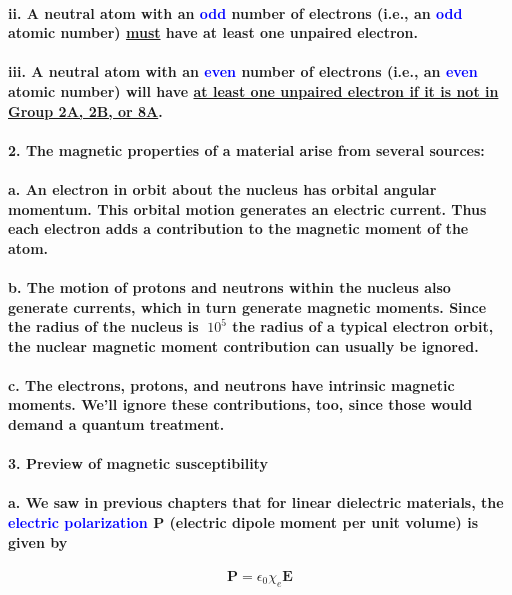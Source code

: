 \documentclass{article}
\begin{document}
\paragraph{\indent\indent ii. A neutral atom with an \textcolor{blue}{odd} number of electrons (i.e., an \textcolor{blue}{odd} atomic number) \underline{must} have at least one unpaired electron.}
\paragraph{\indent\indent iii. A neutral atom with an \textcolor{blue}{even} number of electrons (i.e., an \textcolor{blue}{even} atomic number) will have \underline{at least one unpaired electron if it is not in Group 2A, 2B, or 8A}.}
\paragraph{2. The magnetic properties of a material arise from several sources:}
\paragraph{\indent a. An electron in orbit about the nucleus has orbital angular momentum. This orbital motion generates an electric current. Thus each electron adds a contribution to the magnetic moment of the atom.}
\paragraph{\indent b. The motion of protons and neutrons within the nucleus also generate currents, which in turn generate magnetic moments. Since the radius of the nucleus is $~10^5$ the radius of a typical electron orbit, the nuclear magnetic moment contribution can usually be ignored.}
\paragraph{\indent c. The electrons, protons, and neutrons have intrinsic magnetic moments. We'll ignore these contributions, too, since those would demand a quantum treatment.}
\paragraph{3. Preview of magnetic susceptibility}
\paragraph{\indent a. We saw in previous chapters that for linear dielectric materials, the \textcolor{blue}{electric polarization} $\boldsymbol{P}$ (electric dipole moment per unit volume) is given by}
\begin{equation*}
    \boldsymbol{P}=\epsilon_0\chi_e\boldsymbol{E}
\end{equation*}
\end{document}
